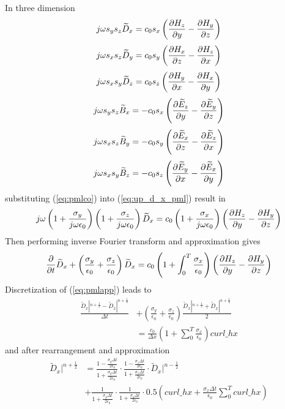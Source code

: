 In three dimension
\begin{equation}\label{eq:up_d_x_pml}
  j\omega s_y s_z \widetilde{D}_x = c_0 s_x \left( \frac{\partial H_z}{\partial y} - \frac{\partial H_y}{\partial z} \right)
\end{equation}
\begin{equation}
  j\omega s_x s_z \widetilde{D}_y = c_0 s_y \left( \frac{\partial H_x}{\partial z} - \frac{\partial H_z}{\partial x} \right)
\end{equation}
\begin{equation}
  j\omega s_x s_y \widetilde{D}_z = c_0 s_z \left( \frac{\partial H_y}{\partial x} - \frac{\partial H_x}{\partial y} \right)
\end{equation}
\begin{equation}
  j\omega s_y s_z \widetilde{B}_x =-c_0 s_x \left(\frac{\partial \widetilde{E}_z}{\partial y} - \frac{\partial \widetilde{E}_y}{\partial z}\right)
\end{equation}
\begin{equation}
  j\omega s_x s_z \widetilde{B}_y =-c_0 s_y \left(\frac{\partial \widetilde{E}_x}{\partial z} - \frac{\partial \widetilde{E}_z}{\partial x}\right)
\end{equation}
\begin{equation}
  j\omega s_x s_y \widetilde{B}_z =-c_0 s_z \left(\frac{\partial \widetilde{E}_y}{\partial x} - \frac{\partial \widetilde{E}_x}{\partial y}\right)
\end{equation}
substituting (\ref{eq:pmlco}) into (\ref{eq:up_d_x_pml}) result in
\begin{equation}
  j\omega
  \left( 1 + \frac{\sigma_y}{j\omega \epsilon_0} \right)
  \left( 1 + \frac{\sigma_z}{j\omega \epsilon_0} \right)\widetilde{D}_x 
  = c_0 \left( 1+\frac{\sigma_x}{j\omega \epsilon_0} \right) \left( \frac{\partial H_z}{\partial y} - \frac{\partial H_y}{\partial z} \right)
\end{equation}
Then performing inverse Fourier transform and approximation gives 
\begin{equation}\label{eq:pmlapp}
  \frac{\partial}{\partial t}\widetilde{D}_x + \left( \frac{\sigma_y}{\epsilon_0} + \frac{\sigma_z}{\epsilon_0} \right) \widetilde{D}_x
  = c_0 \left( 1+\int_0^T\frac{\sigma_x}{\epsilon_0} \right) \left( \frac{\partial H_z}{\partial y} - \frac{\partial H_y}{\partial z} \right)
\end{equation}
Discretization of (\ref{eq:pmlapp}) leads to
\begin{equation}
  \begin{split}
    \frac{\widetilde{D}_x|^{n+\frac{1}{2}} - \widetilde{D}_x|^{n+\frac{1}{2}}}{\Delta t} &+
    \left( \frac{\sigma_y}{\epsilon_0} + \frac{\sigma_z}{\epsilon_0} \right) \frac{\widetilde{D}_x|^{n+\frac{1}{2}} + \widetilde{D}_x|^{n+\frac{1}{2}}}{2} \\
    &=\frac{c_0}{\Delta x} \left( 1 + \sum_0^T \frac{\sigma_x}{\epsilon_0} \right) curl\_hx
  \end{split}
\end{equation}
and after rearrangement and approximation
\begin{equation}
  \begin{split}
    \widetilde{D}_x|^{n+\frac{1}{2}} &=
    \frac{\displaystyle 1 - \frac{\sigma_y\Delta t}{2\epsilon_0}}{\displaystyle 1 + \frac{\sigma_y\Delta t}{2\epsilon_0}} \cdot \frac{\displaystyle 1 - \frac{\sigma_z\Delta t}{2\epsilon_0}}{\displaystyle 1 + \frac{\sigma_z\Delta t}{2\epsilon_0}} \cdot \widetilde{D}_x|^{n-\frac{1}{2}}\\
    & + \frac{1}{\displaystyle 1 + \frac{\sigma_y\Delta t}{2\epsilon_0}} \cdot \frac{1}{\displaystyle 1 + \frac{\sigma_z\Delta t}{2\epsilon_0}} \cdot 0.5 \left( curl\_hx + \frac{\sigma_x \Delta t}{\epsilon_0}\sum_0^T curl\_hx \right)
  \end{split}
\end{equation}
